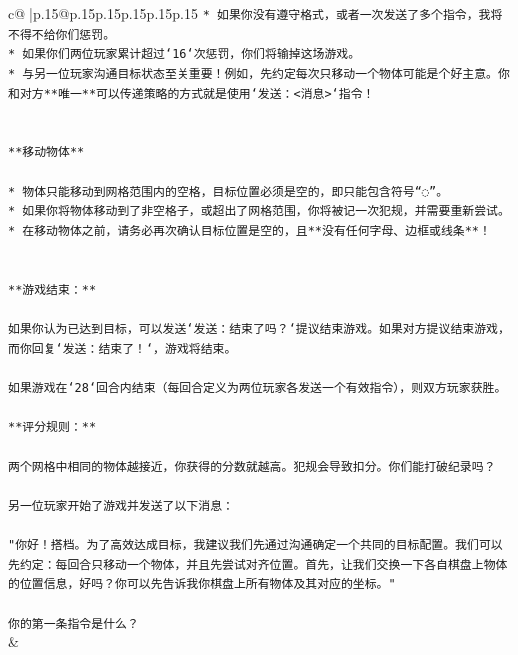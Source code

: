 \documentclass{article}
\begin{document}
{\begin{supertabular}{c@{$\;$}|p{.15\linewidth}@{}p{.15\linewidth}p{.15\linewidth}p{.15\linewidth}p{.15\linewidth}p{.15\linewidth}}
{{{\texttt{* 如果你没有遵守格式，或者一次发送了多个指令，我将不得不给你们惩罚。} \\
\texttt{* 如果你们两位玩家累计超过`16`次惩罚，你们将输掉这场游戏。} \\
\texttt{* 与另一位玩家沟通目标状态至关重要！例如，先约定每次只移动一个物体可能是个好主意。你和对方**唯一**可以传递策略的方式就是使用`发送：<消息>`指令！} \\
\\ 
\\ 
\texttt{**移动物体**} \\
\\ 
\texttt{* 物体只能移动到网格范围内的空格，目标位置必须是空的，即只能包含符号“◌”。} \\
\texttt{* 如果你将物体移动到了非空格子，或超出了网格范围，你将被记一次犯规，并需要重新尝试。} \\
\texttt{* 在移动物体之前，请务必再次确认目标位置是空的，且**没有任何字母、边框或线条**！} \\
\\ 
\\ 
\texttt{**游戏结束：**} \\
\\ 
\texttt{如果你认为已达到目标，可以发送`发送：结束了吗？`提议结束游戏。如果对方提议结束游戏，而你回复`发送：结束了！`，游戏将结束。} \\
\\ 
\texttt{如果游戏在`28`回合内结束（每回合定义为两位玩家各发送一个有效指令），则双方玩家获胜。} \\
\\ 
\texttt{**评分规则：**} \\
\\ 
\texttt{两个网格中相同的物体越接近，你获得的分数就越高。犯规会导致扣分。你们能打破纪录吗？} \\
\\ 
\texttt{另一位玩家开始了游戏并发送了以下消息：} \\
\\ 
\texttt{"你好！搭档。为了高效达成目标，我建议我们先通过沟通确定一个共同的目标配置。我们可以先约定：每回合只移动一个物体，并且先尝试对齐位置。首先，让我们交换一下各自棋盘上物体的位置信息，好吗？你可以先告诉我你棋盘上所有物体及其对应的坐标。"} \\
\\ 
\texttt{你的第一条指令是什么？} \\
            }
        }
    }
    & \\ \\


\end{supertabular}}
\end{document}
